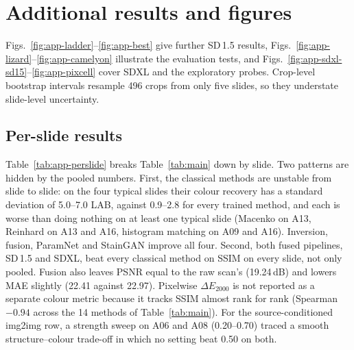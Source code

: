 \section{Additional results and figures}
\label{app:results}
Figs.~\ref{fig:app-ladder}--\ref{fig:app-best} give further SD\,1.5 results,
Figs.~\ref{fig:app-lizard}--\ref{fig:app-camelyon} illustrate the evaluation tests, and
Figs.~\ref{fig:app-sdxl-sd15}--\ref{fig:app-pixcell} cover SDXL and the exploratory probes.
Crop-level bootstrap intervals resample 496 crops from only five slides, so they understate slide-level
uncertainty.

\subsection{Per-slide results}
\label{app:perslide}
Table~\ref{tab:app-perslide} breaks Table~\ref{tab:main} down by slide. Two patterns are hidden by the pooled numbers.
First, the classical methods are unstable from slide to slide: on the four typical slides their colour recovery has a
standard deviation of 5.0--7.0 LAB, against 0.9--2.8 for every trained method, and each is worse than doing nothing
on at least one typical slide (Macenko on A13, Reinhard on A13 and A16, histogram matching on A09 and A16).
Inversion, fusion, ParamNet and StainGAN improve all four. Second, both fused pipelines, SD\,1.5 and SDXL, beat every
classical method on SSIM on every slide, not only pooled. Fusion also leaves PSNR equal to the raw scan's (19.24\,dB)
and lowers MAE slightly (22.41 against 22.97). Pixelwise $\Delta E_{2000}$ is not reported as a separate colour
metric because it tracks SSIM almost rank for rank (Spearman $-0.94$ across the 14 methods of Table~\ref{tab:main}).
For the source-conditioned img2img row, a strength sweep on A06 and A08 (0.20--0.70) traced a smooth
structure--colour trade-off in which no setting beat 0.50 on both.

